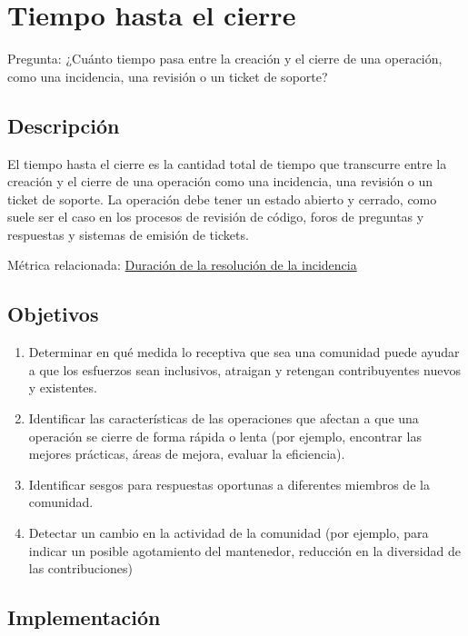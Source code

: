 \hypertarget{tiempo-hasta-el-cierre}{%
\section{Tiempo hasta el cierre}\label{tiempo-hasta-el-cierre}}

Pregunta: ¿Cuánto tiempo pasa entre la creación y el cierre de una
operación, como una incidencia, una revisión o un ticket de soporte?

\hypertarget{descripciuxf3n}{%
\subsection{Descripción}\label{descripciuxf3n}}

El tiempo hasta el cierre es la cantidad total de tiempo que transcurre
entre la creación y el cierre de una operación como una incidencia, una
revisión o un ticket de soporte. La operación debe tener un estado
abierto y cerrado, como suele ser el caso en los procesos de revisión de
código, foros de preguntas y respuestas y sistemas de emisión de
tickets.

Métrica relacionada:
\href{https://chaoss.community/metric-issue-resolution-duration/}{Duración
de la resolución de la incidencia}

\hypertarget{objetivos}{%
\subsection{Objetivos}\label{objetivos}}

\begin{enumerate}
\tightlist
\item
  Determinar en qué medida lo receptiva que sea una comunidad puede
  ayudar a que los esfuerzos sean inclusivos, atraigan y retengan
  contribuyentes nuevos y existentes.
\item
  Identificar las características de las operaciones que afectan a que
  una operación se cierre de forma rápida o lenta (por ejemplo,
  encontrar las mejores prácticas, áreas de mejora, evaluar la
  eficiencia).
\item
  Identificar sesgos para respuestas oportunas a diferentes miembros de
  la comunidad.
\item
  Detectar un cambio en la actividad de la comunidad (por ejemplo, para
  indicar un posible agotamiento del mantenedor, reducción en la
  diversidad de las contribuciones)
\end{enumerate}

\hypertarget{implementaciuxf3n}{%
\subsection{Implementación}\label{implementaciuxf3n}}

